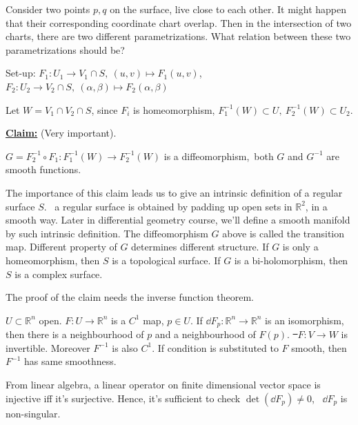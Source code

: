 \begin{question}
    Consider two points \(p,q\) on the surface, live close to each other. It might
    happen that their corresponding coordinate chart overlap. Then in the
    intersection of two charts, there are two different parametrizations. What
    relation between these two parametrizations should be?
\end{question}

Set-up: \(F_1\colon U_1\to V_1\cap S,\ (u,v)\mapsto F_1(u,v)\),\hfill \(F_2\colon
U_2\to V_2\cap S,\ (\alpha,\beta)\mapsto F_2(\alpha,\beta)\)

Let \(W=V_1\cap V_2\cap S\), since \(F_i\) is homeomorphism, \(F_1^{-1}(W)\subset U,
\ F_2^{-1}(W)\subset U_2\).

\noindent\underline{\textbf{Claim:}} (Very important).\par
\(G=F_2^{-1}\circ F_1\colon F_1^{-1}(W)\to F_2^{-1}(W)\) is a diffeomorphism,\ie\ 
both \(G\) and \(G^{-1}\) are smooth functions.

The importance of this claim leads us to give an intrinsic definition of a regular
surface \(S\). \ie\ a regular surface is obtained by padding up open sets in
\(\mathbb{R}^2\), in a smooth way. Later in differential geometry course, we'll
define a smooth manifold by such intrinsic definition. The diffeomorphism \(G\)
above is called the transition map. Different property of \(G\) determines different
structure. If \(G\) is only a homeomorphism, then \(S\) is a topological surface.
If \(G\) is a bi-holomorphism, then \(S\) is a complex surface.

The proof of the claim needs the inverse function theorem.
\begin{theorem}
    \(U\subset \mathbb{R}^n\) open. \(F\colon U\to \mathbb{R}^n\) is a \(C^1\) map,
    \(p\in U\). If \(\dd{F_p}\colon \mathbb{R}^n\to \mathbb{R}^n\) is an isomorphism,
    then there is a neighbourhood of \(p\) and a neighbourhood of \(F(p)\).
    \st\ \(F\colon V\to W\) is invertible. Moreover \(F^{-1}\) is also \(C^1\). If
    condition is substituted to \(F\) smooth, then \(F^{-1}\) has same smoothness.
\end{theorem}

\begin{remark}
    From linear algebra, a linear operator on finite dimensional vector space
    is injective iff it's surjective. Hence, it's sufficient to check \(\det(\dd{F_p})
    \neq 0\), \ie\ \(\dd{F_p}\) is non-singular.
\end{remark}

